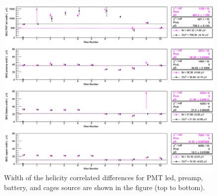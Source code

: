 \begin{singlespace}
\begin{figure}[!h]
	\centering
	\includegraphics[width=15.0cm]{figures/pedestalDiffBkgOtherWidth}
	\caption
	{Width of the helicity correlated differences for PMT led, preamp, battery, and cages source are shown in the figure (top to bottom).}
	\label{fig:pedestalDiffBkgOtherWidth}
\end{figure}
\end{singlespace}
